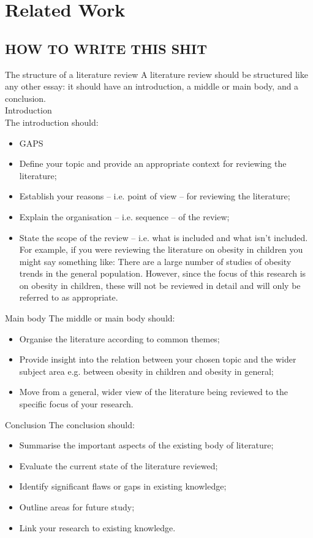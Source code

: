 \chapter{Related Work}

\section{HOW TO WRITE THIS SHIT}
The structure of a literature review
A literature review should be structured like any other essay: it should have an introduction, a middle or main body, and a conclusion.
\\Introduction
\\The introduction should:
\begin{itemize}
    \item GAPS
    \item Define your topic and provide an appropriate context for reviewing the literature;
    \item Establish your reasons – i.e. point of view – for reviewing the literature;
    \item Explain the organisation – i.e. sequence – of the review;
    \item State the scope of the review – i.e. what is included and what isn’t included. For example, if you were reviewing the literature on obesity in children you might say something like: There are a large number of studies of obesity trends in the general population. However, since the focus of this research is on obesity in children, these will not be reviewed in detail and will only be referred to as appropriate.
\end{itemize}

Main body
The middle or main body should:

\begin{itemize}
    \item Organise the literature according to common themes;
    \item Provide insight into the relation between your chosen topic and the wider subject area e.g. between obesity in children and obesity in general;
    \item Move from a general, wider view of the literature being reviewed to the specific focus of your research.
\end{itemize}

Conclusion
The conclusion should:
\begin{itemize}
    \item Summarise the important aspects of the existing body of literature;
    \item Evaluate the current state of the literature reviewed;
    \item Identify significant flaws or gaps in existing knowledge;
    \item Outline areas for future study;
    \item Link your research to existing knowledge.
\end{itemize}
\newpage

